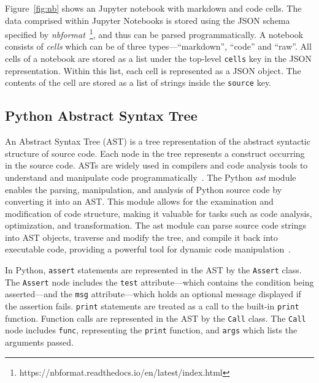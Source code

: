 
Figure~\ref{fig:nb} shows an Jupyter notebook with markdown and code cells. The data comprised within Jupyter Notebooks is stored using the JSON schema specified by \emph{nbformat}~\footnote{https://nbformat.readthedocs.io/en/latest/index.html}, and thus can be parsed programmatically. A notebook consists of \emph{cells} which can be of three types---``markdown'', ``code'' and ``raw''. All cells of a notebook are stored as a list under the top-level \lstinline[language={}]$cells$ key in the JSON representation. Within this list, each cell is represented as a JSON object. The contents of the cell are stored as a list of strings inside the \lstinline[language={}]$source$ key.

\subsection{Python Abstract Syntax Tree}


An Abstract Syntax Tree (AST) is a tree representation of the abstract syntactic structure of source code. Each node in the tree represents a construct occurring in the source code. ASTs are widely used in compilers and code analysis tools to understand and manipulate code programmatically~\cite{wikipedia2024abstract}. The Python \emph{ast} module enables the parsing, manipulation, and analysis of Python source code by converting it into an AST. This module allows for the examination and modification of code structure, making it valuable for tasks such as code analysis, optimization, and transformation. The ast module can parse source code strings into AST objects, traverse and modify the tree, and compile it back into executable code, providing a powerful tool for dynamic code manipulation~\cite{pythonast}.

In Python, \lstinline{assert} statements are represented in the AST by the \lstinline{Assert} class. The \lstinline{Assert} node includes the \lstinline{test} attribute---which contains the condition being asserted---and the \lstinline{msg} attribute---which holds an optional message displayed if the assertion fails. \lstinline{print} statements are treated as a call to the built-in \lstinline{print} function. Function calls are represented in the AST by the \lstinline{Call} class. The \lstinline{Call} node includes \lstinline{func}, representing the \lstinline{print} function, and \lstinline{args} which lists the arguments passed.

